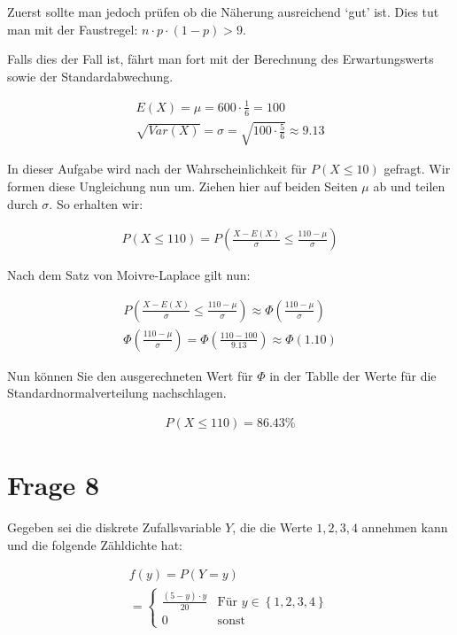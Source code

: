 Zuerst sollte man jedoch prüfen ob die Näherung ausreichend `gut' ist. Dies tut man mit der Faustregel:  $n \cdot p \cdot (1 - p) > 9$.

Falls dies der Fall ist, fährt man fort mit der Berechnung des Erwartungswerts sowie der Standardabwechung.

\begin{align*}
    E(X) = \mu = 600 \cdot \frac{1}{6} = 100 \\
    \sqrt{Var(X)} = \sigma = \sqrt{100 \cdot \frac{5}{6}} \approx 9.13
\end{align*}

In dieser Aufgabe wird nach der Wahrscheinlichkeit für $P(X \leq 10)$ gefragt. Wir formen diese Ungleichung nun um. Ziehen hier auf beiden Seiten $\mu$ ab und teilen durch $\sigma$. So erhalten wir:

\begin{align*}
    P(X \leq 110) = P\left(\frac{X - E(X)}{\sigma} \leq \frac{110 - \mu}{\sigma}\right) 
\end{align*}

Nach dem Satz von Moivre-Laplace gilt nun:

\begin{align*}
    P\left(\frac{X - E(X)}{\sigma} \leq \frac{110 - \mu}{\sigma}\right) \approx \Phi\left(\frac{110 - \mu}{\sigma}\right) \\
    \Phi\left(\frac{110 - \mu}{\sigma}\right) = \Phi(\frac{110 - 100}{9.13}) \approx \Phi(1.10)
\end{align*}

Nun können Sie den ausgerechneten Wert für $\Phi$ in der Tablle der Werte für die Standardnormalverteilung nachschlagen.

\begin{align*}
    P(X \leq 110) = 86.43\%
\end{align*}

\section{Frage 8}

Gegeben sei die diskrete Zufallsvariable $Y$, die die Werte $1,2,3,4$ annehmen kann und die folgende Zähldichte hat:

\begin{align*}
    f(y) = P(Y = y) \\
    = \begin{cases}
        \frac{(5 - y) \cdot y}{20} & \text{Für } y \in \left\{1, 2, 3, 4\right\}\\
        0 & \text{sonst}
    \end{cases}
\end{align*}

